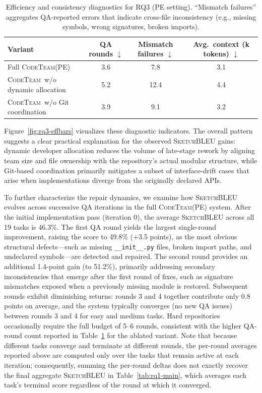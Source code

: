 \documentclass[format=acmsmall, review=false, screen=true]{acmart}
\newcommand{\tool}{\textsc{CodeTeam}\xspace}
\newcommand{\sketchbleu}{\textsc{SketchBLEU}\xspace}
\begin{document}
\begin{table}[t]
\centering
\small
\caption{Efficiency and consistency diagnostics for RQ3 (PE setting). ``Mismatch failures'' aggregates QA-reported errors that indicate cross-file inconsistency (e.g., missing symbols, wrong signatures, broken imports).}
\label{tab:rq3-eff}
\begin{tabular}{@{}lccc@{}}
\toprule
Variant & QA rounds $\downarrow$ & Mismatch failures $\downarrow$ & Avg.\ context (k tokens) $\downarrow$ \\
\midrule
Full \tool (PE) & 3.6 & 7.8 & 3.1 \\
\tool\ w/o dynamic allocation & 5.2 & 12.4 & 4.4 \\
\tool\ w/o Git coordination & 3.9 & 9.1 & 3.2 \\
\bottomrule
\end{tabular}
\end{table}

Figure~\ref{fig:rq3-effbars} visualizes these diagnostic indicators.
The overall pattern suggests a clear practical explanation for the observed \sketchbleu gains: dynamic developer allocation reduces the volume of late-stage rework by aligning team size and file ownership with the repository's actual modular structure, while Git-based coordination primarily mitigates a subset of interface-drift cases that arise when implementations diverge from the originally declared APIs.

To further characterize the repair dynamics, we examine how \sketchbleu evolves across successive QA iterations in the full \tool (PE) system.
After the initial implementation pass (iteration 0), the average \sketchbleu across all 19 tasks is 46.3\%.
The first QA round yields the largest single-round improvement, raising the score to 49.8\% (+3.5 points), as the most obvious structural defects---such as missing \texttt{\_\_init\_\_.py} files, broken import paths, and undeclared symbols---are detected and repaired.
The second round provides an additional 1.4-point gain (to 51.2\%), primarily addressing secondary inconsistencies that emerge after the first round of fixes, such as signature mismatches exposed when a previously missing module is restored.
Subsequent rounds exhibit diminishing returns: rounds 3 and 4 together contribute only 0.8 points on average, and the system typically converges (no new QA issues) between rounds 3 and 4 for easy and medium tasks.
Hard repositories occasionally require the full budget of 5--6 rounds, consistent with the higher QA-round count reported in Table~\ref{tab:rq3-eff} for the ablated variant.
Note that because different tasks converge and terminate at different rounds, the per-round averages reported above are computed only over the tasks that remain active at each iteration; consequently, summing the per-round deltas does not exactly recover the final aggregate \sketchbleu in Table~\ref{tab:rq1-main}, which averages each task's terminal score regardless of the round at which it converged.
\end{document}
